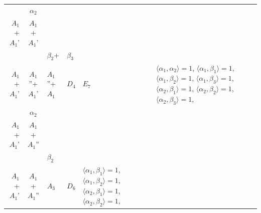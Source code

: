 \documentclass[12pt]{report}
\begin{document}
\begin{appendix}
{\begin{longtable}{rcl p{1cm}p{1cm}p{3cm} }
\\
\begin{tabular}{cc}$\alpha_1$+ & $\alpha_2$\\\tiny{ $A_1$+$A_1$' } & \tiny{ $A_1$+$A_1$' }\end{tabular} &\begin{tabular}{c} = \\~ \end{tabular} & \begin{tabular}{ccc}$\beta_1$+ & $\beta_2$+ & $\beta_3$\\\tiny{ $A_1$+$A_1$' } & \tiny{ $A_1$''+$A_1$' } & \tiny{ $A_1$''+$A_1$ }\end{tabular} & $D_4$ & $E_7$ & $\langle\alpha_1, \alpha_2\rangle=1$,  $\langle\alpha_1, \beta_1\rangle=1$, $\langle\alpha_1, \beta_2\rangle=1$, $\langle\alpha_1, \beta_3\rangle=1$, $\langle\alpha_2, \beta_1\rangle=1$, $\langle\alpha_2, \beta_2\rangle=1$, $\langle\alpha_2, \beta_3\rangle=1$, 
\\
\begin{tabular}{cc}$\alpha_1$+ & $\alpha_2$\\\tiny{ $A_1$+$A_1$' } & \tiny{ $A_1$+$A_1$'' }\end{tabular} &\begin{tabular}{c} = \\~ \end{tabular} & \begin{tabular}{cc}$\beta_1$+ & $\beta_2$\\\tiny{ $A_1$+$A_1$' } & \tiny{ $A_1$+$A_1$'' }\end{tabular} & $A_3$ & $D_6$ &  $\langle\alpha_1, \beta_1\rangle=1$, $\langle\alpha_1, \beta_2\rangle=1$, $\langle\alpha_2, \beta_1\rangle=1$, $\langle\alpha_2, \beta_2\rangle=1$, 
\\
\end{longtable}


}
\end{appendix}
\end{document}
